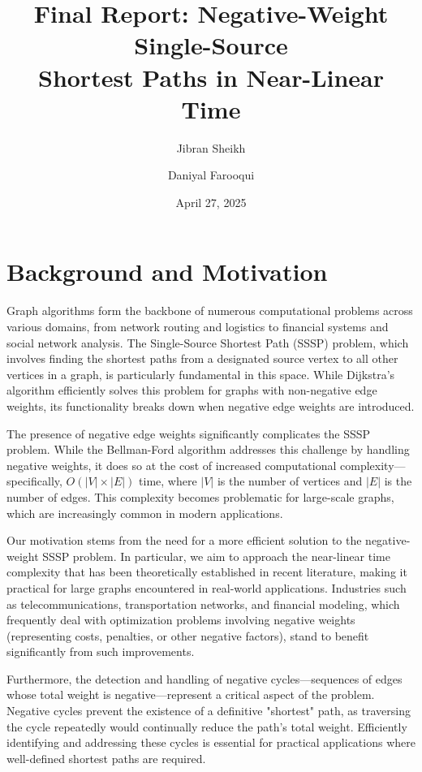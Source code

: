 \documentclass[11pt]{article}
\title{\Large \textbf{Final Report: Negative-Weight Single-Source\\Shortest Paths in Near-Linear Time}}
\author{Jibran Sheikh \and Daniyal Farooqui}
\date{April 27, 2025}
\begin{document}
\maketitle

\section{Background and Motivation}

Graph algorithms form the backbone of numerous computational problems across various domains, from network routing and logistics to financial systems and social network analysis. The Single-Source Shortest Path (SSSP) problem, which involves finding the shortest paths from a designated source vertex to all other vertices in a graph, is particularly fundamental in this space. While Dijkstra's algorithm efficiently solves this problem for graphs with non-negative edge weights, its functionality breaks down when negative edge weights are introduced.

The presence of negative edge weights significantly complicates the SSSP problem. While the Bellman-Ford algorithm addresses this challenge by handling negative weights, it does so at the cost of increased computational complexity—specifically, $O(|V| \times |E|)$ time, where $|V|$ is the number of vertices and $|E|$ is the number of edges. This complexity becomes problematic for large-scale graphs, which are increasingly common in modern applications.

Our motivation stems from the need for a more efficient solution to the negative-weight SSSP problem. In particular, we aim to approach the near-linear time complexity that has been theoretically established in recent literature, making it practical for large graphs encountered in real-world applications. Industries such as telecommunications, transportation networks, and financial modeling, which frequently deal with optimization problems involving negative weights (representing costs, penalties, or other negative factors), stand to benefit significantly from such improvements.

Furthermore, the detection and handling of negative cycles—sequences of edges whose total weight is negative—represent a critical aspect of the problem. Negative cycles prevent the existence of a definitive "shortest" path, as traversing the cycle repeatedly would continually reduce the path's total weight. Efficiently identifying and addressing these cycles is essential for practical applications where well-defined shortest paths are required.
\end{document}
